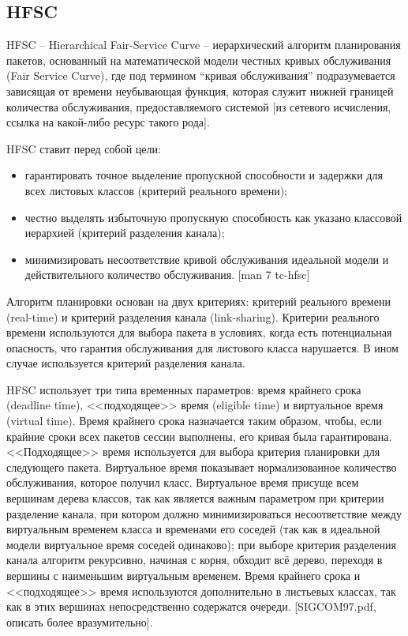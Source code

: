 	\subsection{HFSC}

        HFSC -- Hierarchical Fair-Service Curve -- иерархический алгоритм планирования пакетов,
        основанный на математической модели честных кривых обслуживания (Fair Service Curve),
        где под термином “кривая обслуживания” подразумевается зависящая от времени
        неубывающая функция, которая служит нижней границей количества обслуживания,
        предоставляемого системой [из сетевого исчисления, ссылка на какой-либо ресурс
        такого рода].

	
        HFSC ставит перед собой цели:
		\begin{itemize}
            \item гарантировать точное выделение пропускной способности и задержки для всех листовых классов (критерий реального времени);
            \item честно выделять избыточную пропускную способность как указано классовой иерархией (критерий разделения канала);
            \item минимизировать несоответствие кривой обслуживания идеальной модели и действительного количество обслуживания. [man 7 tc-hfsc]
		\end{itemize}

        Алгоритм планировки основан на двух критериях: критерий реального времени
        (real-time) и критерий разделения канала (link-sharing). Критерии реального времени
        используются для выбора пакета в условиях, когда есть потенциальная опасность,
        что гарантия обслуживания для листового класса нарушается. В ином случае
        используется критерий разделения канала.

        HFSC использует три типа временных параметров: время крайнего срока (deadline
        time), <<подходящее>> время (eligible time) и виртуальное время (virtual time). Время крайнего
        срока назначается таким образом, чтобы, если крайние сроки всех пакетов сессии
        выполнены, его кривая была гарантирована. <<Подходящее>> время используется для
        выбора критерия планировки для следующего пакета. Виртуальное время показывает
        нормализованное количество обслуживания, которое получил класс. Виртуальное
        время присуще всем вершинам дерева классов, так как является важным параметром
        при критерии разделение канала, при котором должно минимизироваться
        несоответствие между виртуальным временем класса и временами его соседей
        (так как в идеальной модели виртуальное время соседей одинаково); при выборе
        критерия разделения канала алгоритм рекурсивно, начиная с корня, обходит всё
        дерево, переходя в вершины с наименьшим виртуальным временем. Время крайнего
        срока и <<подходящее>> время используются дополнительно в листьевых классах,
        так как в этих вершинах непосредственно содержатся очереди. [SIGCOM97.pdf, описать
        более вразумительно].

